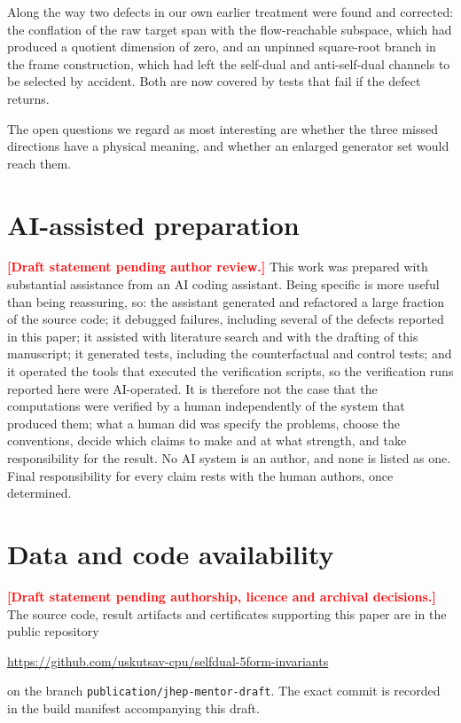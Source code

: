 \documentclass[11pt,a4paper]{article}
\theoremstyle{definition}
\theoremstyle{remark}
\newcommand{\pending}[1]{\textcolor{red}{\textbf{[#1]}}}
\begin{document}
Along the way two defects in our own earlier treatment were found and corrected:
the conflation of the raw target span with the flow-reachable subspace, which had
produced a quotient dimension of zero, and an unpinned square-root branch in the
frame construction, which had left the self-dual and anti-self-dual channels to
be selected by accident. Both are now covered by tests that fail if the defect
returns.

The open questions we regard as most interesting are whether the three missed
directions have a physical meaning, and whether an enlarged generator set would
reach them.

\section*{AI-assisted preparation}

\pending{Draft statement pending author review.}
This work was prepared with substantial assistance from an AI coding assistant.
Being specific is more useful than being reassuring, so: the assistant generated
and refactored a large fraction of the source code; it debugged failures,
including several of the defects reported in this paper; it assisted with
literature search and with the drafting of this manuscript; it generated tests,
including the counterfactual and control tests; and it operated the tools that
executed the verification scripts, so the verification runs reported here were
AI-operated. It is therefore not the case that the computations were verified by
a human independently of the system that produced them; what a human did was
specify the problems, choose the conventions, decide which claims to make and at
what strength, and take responsibility for the result. No AI system is an author,
and none is listed as one. Final responsibility for every claim rests with the
human authors, once determined.

\section*{Data and code availability}

\pending{Draft statement pending authorship, licence and archival decisions.}
The source code, result artifacts and certificates supporting this paper are in
the public repository
\begin{center}
\url{https://github.com/uskutsav-cpu/selfdual-5form-invariants}
\end{center}
on the branch \texttt{publication/jhep-mentor-draft}. The exact commit is
recorded in the build manifest accompanying this draft.
\end{document}
